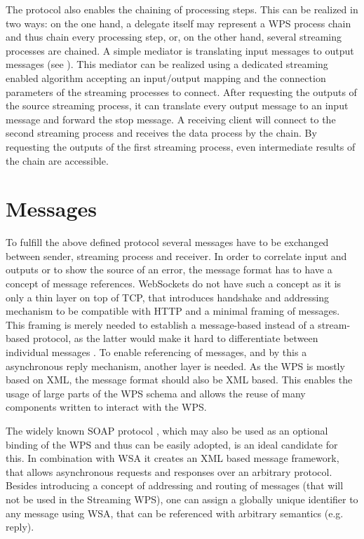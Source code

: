 		The protocol also enables the chaining of processing steps. This can be realized in two ways: on the one hand, a delegate itself may represent a \ac{WPS} process chain and thus chain every processing step, or, on the other hand, several streaming processes are chained. A simple mediator is translating input messages to output messages (see ). This mediator can be realized using a dedicated streaming enabled algorithm accepting an input/output mapping and the connection parameters of the streaming processes to connect. After requesting the outputs of the source streaming process, it can translate every output message to an input message and forward the stop message. A receiving client will connect to the second streaming process and receives the data process by the chain. By requesting the outputs of the first streaming process, even intermediate results of the chain are accessible.

	\section{Messages}
		\label{sec:streaming:messages}
		To fulfill the above defined protocol several messages have to be exchanged between sender, streaming process and receiver. In order to correlate input and outputs or to show the source of an error, the message format has to have a concept of message references. WebSockets do not have such a concept as it is only a thin layer on top of TCP, that introduces handshake and addressing mechanism to be compatible with HTTP and a minimal framing of messages. This framing is merely needed to establish a message-based instead of a stream-based protocol, as the latter would make it hard to differentiate between individual messages \citep{ietf:rfc6455}. To enable referencing of messages, and by this a asynchronous reply mechanism, another layer is needed. As the \ac{WPS} is mostly based on \ac{XML}, the message format should also be \ac{XML} based. This enables the usage of large parts of the \ac{WPS} schema and allows the reuse of many components written to interact with the \ac{WPS}.

		The widely known SOAP protocol \citep{w3c:soap1}, which may also be used as an optional binding of the \ac{WPS} \citep{ogc:wps} and thus can be easily adopted, is an ideal candidate for this. In combination with \ac{WSA} \citep{w3c:wsa} it creates an \ac{XML} based message framework, that allows asynchronous requests and responses over an arbitrary protocol. Besides introducing a concept of addressing and routing of messages (that will not be used in the Streaming \ac{WPS}), one can assign a globally unique identifier to any message using \ac{WSA}, that can be referenced with arbitrary semantics (e.g. reply).

